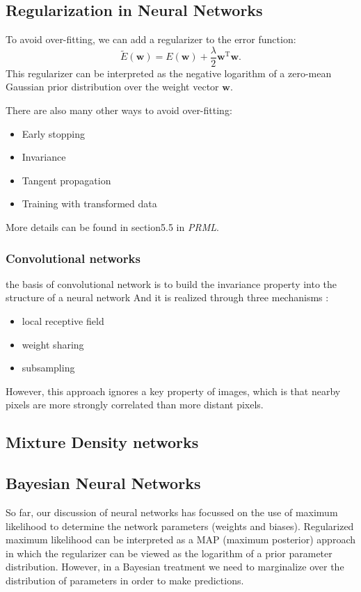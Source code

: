\documentclass[a4paper]{book}
\newcommand{\mrm}{\mathrm}
\newcommand{\mbf}{\mathbf}
\newcommand{\ww}{\mbf w}
\newcommand{\trans}{^{\mrm T}}
\newcommand{\tit}{\textit}
\begin{document}
\subsection{Regularization in Neural Networks}
To avoid over-fitting, we can add a regularizer to the error function: 
\begin{equation}\label{}
  \tilde{E}(\ww) = E(\ww)+\frac{\lambda}{2}\ww\trans\ww.
\end{equation}
This regularizer can be interpreted as the negative logarithm of a zero-mean Gaussian prior distribution over the weight vector $\ww$. 

There are also many other ways to avoid over-fitting:
\begin{itemize}
  \item Early stopping
  \item Invariance 
  \item Tangent propagation
  \item Training with transformed data
\end{itemize}
More details can be found in section5.5 in \tit{PRML}.
\subsubsection{Convolutional networks}
the basis of  convolutional network is to build the invariance property into the structure of a neural network And it is realized through three mechanisms :
\begin{itemize}
  \item local receptive field
  \item weight sharing
  \item subsampling
\end{itemize}
However, this approach ignores a key property of images, which is that nearby pixels are more strongly correlated than more distant pixels.
\subsection{Mixture Density networks}


\subsection{Bayesian Neural Networks}
So far, our discussion of neural networks has focussed on the use of maximum likelihood to determine the network parameters (weights and biases). Regularized maximum likelihood can be interpreted as a MAP (maximum posterior) approach in which the regularizer can be viewed as the logarithm of a prior parameter distribution. However, in a Bayesian treatment we need to marginalize over the distribution of parameters in order to make predictions.
\end{document}
